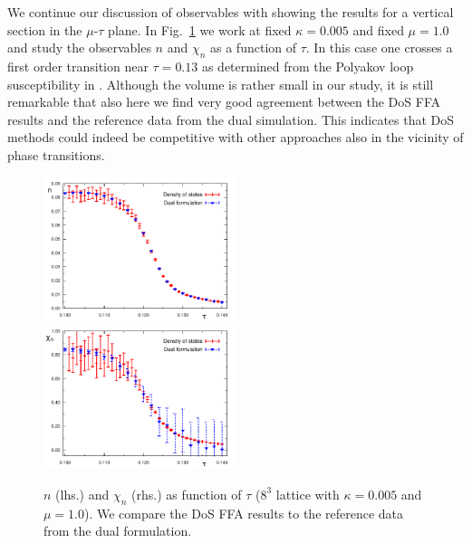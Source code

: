 \documentclass[a4paper,11pt]{article}
\begin{document}
We continue our discussion of observables with showing the results for a vertical section in the 
$\mu$-$\tau$ plane. In Fig.~\ref{fig:results_8_taurun} we work at fixed $\kappa = 0.005$ and fixed 
$\mu = 1.0$ and study the observables $n$ and $\chi_n$ as a function of $\tau$.  In this case 
one crosses a first order transition near $\tau = 0.13$ as determined from the Polyakov loop susceptibility in  
\cite{Mercado:2012ue}. Although the volume is rather small in our study, 
it is still remarkable that also here we find very good agreement between the DoS FFA results and the reference data
from the dual simulation. This indicates that DoS methods could indeed be competitive with other approaches also 
in the vicinity of phase transitions. 

\begin{figure}[t]
\begin{center}
\hspace*{-3mm}
{\includegraphics[width=0.5\textwidth]{N_8to3_tau_run.pdf}} 
{\includegraphics[width=0.5\textwidth]{Susce_8to3_tau_run.pdf}} 
\end{center}
\caption{$n$ (lhs.) and $\chi_n$ (rhs.) as function of $\tau$ ($8^3$ lattice with $\kappa=0.005$ and $\mu=1.0$).
We compare the DoS FFA results to the reference data from the dual formulation.}
\label{fig:results_8_taurun}
\end{figure}
\end{document}
